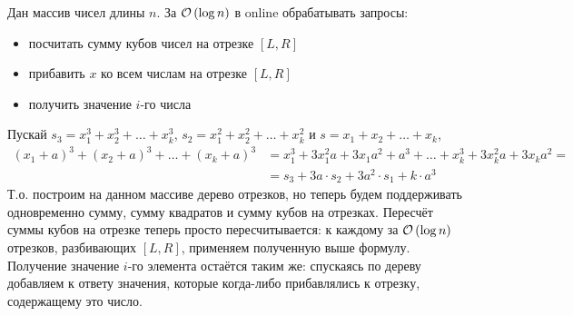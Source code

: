 \begin{task}[3]
Дан массив чисел длины $n$. За $\mathcal{O}\left(\log{n}\right)$ в online обрабатывать запросы:
\begin{itemize}
	\item посчитать сумму кубов чисел на отрезке $[L,R]$
	\item прибавить $x$ ко всем числам на отрезке $[L,R]$
	\item получить значение $i$-го числа
\end{itemize}
\end{task}
\begin{solution}
Пускай $s_3 = x_1^3 + x_2^3 + \ldots + x_k^3$, $s_2 = x_1^2 + x_2^2 + \ldots + x_k^2$ и $s = x_1 + x_2 + \ldots + x_k$,
\begin{equation*}
\begin{split}
(x_1+a)^3 + (x_2+a)^3 + \ldots + (x_k+a)^3 &= x_1^3 + 3x_1^2a + 3x_1a^2 + a^3 + \ldots + x_k^3 + 3x_k^2a + 3x_ka^2 =\\ 
&= s_3 + 3a \cdot s_2 + 3a^2 \cdot s_1 + k \cdot a^3 
\end{split}
\end{equation*}
Т.о. построим на данном массиве дерево отрезков, но теперь будем поддерживать одновременно сумму, сумму квадратов и сумму кубов на отрезках. Пересчёт суммы кубов на отрезке теперь просто пересчитывается: к каждому за $\mathcal{O}\left(\log{n}\right)$ отрезков, разбивающих $[L,R]$, применяем полученную выше формулу. Получение значение $i$-го элемента остаётся таким же: спускаясь по дереву добавляем к ответу значения, которые когда-либо прибавлялись к отрезку, содержащему это число. \xqed
\end{solution}

